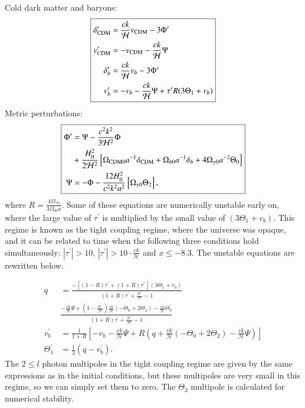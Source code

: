 \documentclass{aa}
\begin{document}
Cold dark matter and baryons:
$$
\boxed{
\begin{aligned}
\delta_{\rm CDM}^\prime &= \frac{ck}{\mathcal{H}} v_{\rm CDM} - 3\Phi^\prime \\
v_{\rm CDM}^\prime &= -v_{\rm CDM} -\frac{ck}{\mathcal{H}} \Psi \\
\delta_b^\prime &= \frac{ck}{\mathcal{H}}v_b -3\Phi^\prime \\
v_b^\prime &= -v_b - \frac{ck}{\mathcal{H}}\Psi + \tau^\prime R(3\Theta_1 + v_b) \\
\end{aligned}
}
$$
Metric perturbations:
$$
\boxed{
\begin{aligned}
\Phi^\prime &= \Psi - \frac{c^2k^2}{3\mathcal{H}^2} \Phi\\
&+ \frac{H_0^2}{2\mathcal{H}^2}
\left[\Omega_{\rm CDM 0} a^{-1} \delta_{\rm CDM} + \Omega_{b 0} a^{-1} \delta_b + 4\Omega_{\gamma 0}
a^{-2}\Theta_0\right] \\
\Psi &= -\Phi - \frac{12H_0^2}{c^2k^2a^2}\left[\Omega_{\gamma 0}\Theta_2\right], \\
\end{aligned}
}
$$
where $R = \frac{4\Omega_{\gamma 0}}{3\Omega_{b 0} a}$. Some of these equations are numerically unstable early on, where the large value of $\tau^\prime$ is multiplied by the small value of $(3\Theta_1+v_b)$.  
This regime is known as the tight coupling regime, where the universe was opaque, and it can be related to time when the following three conditions hold simultaneously: $|\tau^\prime|>10$, $|\tau^\prime|>10\cdot \frac{ck}{\mathcal{H}}$ and
$x\leq -8.3$. The unstable equations are rewritten below.

$$
\boxed{
\begin{aligned}
q &= \frac{-[(1-R)\tau^\prime + (1+R)\tau^{\prime\prime}](3\Theta_1+v_b)}{(1+R)\tau^\prime + \frac{\mathcal{H}^\prime}{\mathcal{H}} -1}\\
  &\frac{-\frac{ck}{\mathcal{H}}\Psi + (1-\frac{\mathcal{H}^\prime}{\mathcal{H}})\frac{ck}{\mathcal{H}}(-\Theta_0 +
2\Theta_2) - \frac{ck}{\mathcal{H}}\Theta_0^\prime}{(1+R)\tau^\prime + \frac{\mathcal{H}^\prime}{\mathcal{H}} -1}\\
v_b^\prime &= \frac{1}{1+R} \left[-v_b - \frac{ck}{\mathcal{H}}\Psi + R(q +
\frac{ck}{\mathcal{H}}(-\Theta_0 + 2\Theta_2) - \frac{ck}{\mathcal{H}}\Psi)\right]\\
\Theta^\prime_1 &= \frac{1}{3} (q - v_b^\prime).
\end{aligned}
}
$$
The $2 \leq l$ photon multipoles in the tight coupling regime are given by the same expressions as in the initial conditions, but these multipoles are very small in this regime,
so we can simply set them to zero. The $\Theta_2$ multipole is calculated for numerical stability.\\
\\
\end{document}
